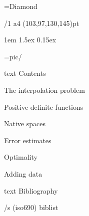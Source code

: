 \useOpTeX  %


\hyperlinks \Black \Black
{}

\enlang
\fontfam[GaramondMT]\load[patches]\let\semibold\bf \typosize[12/14.1818]

\font\symbols=Diamond %
\def\QED{\hbox{\symbols\resizethefont \,❖}}


\margins/1 a4 (103,97,130,145)pt


\parindent 1em
\parskip 1.5ex
 0.15ex

\picdir={pic/}


\bgroup
\let\_mtext\ignoreit
\nonum\notoc\chap Contents
\egroup
\tocpage


\sec The interpolation problem


\sec Positive definite functions


\sec Native spaces


\sec[errorsec] Error estimates


\sec Optimality


\sec[addingsec] Adding data







\bgroup
\let\_mtext\ignoreit
\nonum\chap Bibliography

\def\_opwarning#1{}
\usebib/s (iso690) biblist
\egroup

\bye
